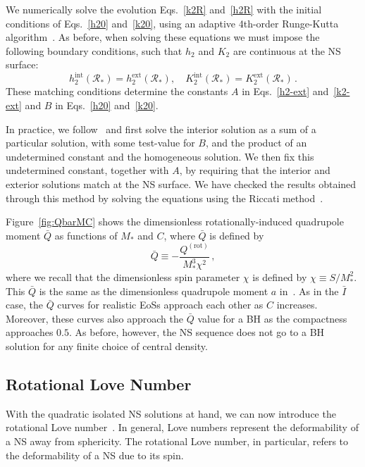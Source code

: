 \documentclass[aps,twocolumn,nofootinbib,showpacs,superscriptaddress,hyperref]{revtex4-1}
\newcommand\be{\begin{equation}}
\newcommand\ee{\end{equation}}
\newcommand{\NS}{*}
\newcommand{\ext}{\mathrm{ext}}
\newcommand{\inter}{\mathrm{int}}
\newcommand{\RNS}{\mathcal{R}_*}
\newcommand{\rot}{\mathrm{(rot)}}
\newcommand{\Qbar}{\bar{Q}}
\begin{document}
We numerically solve the evolution Eqs.~\eqref{k2R} and~\eqref{h2R} with the initial conditions of Eqs.~\eqref{h20} and~\eqref{k20}, using an adaptive 4th-order Runge-Kutta algorithm~\cite{gsl}. As before, when solving these equations we must impose the following boundary conditions, such that $h_2$ and $K_2$ are continuous at the NS surface:
%
\be
h_2^\inter (\RNS) = h_2^\ext (\RNS), \quad K_2^\inter (\RNS) = K_2^\ext (\RNS)\,.
\ee
%
These matching conditions determine the constants $A$ in Eqs.~\eqref{h2-ext} and~\eqref{k2-ext} and $B$ in Eqs.~\eqref{h20} and~\eqref{k20}. 

In practice, we follow~\cite{hartle1967,kent-CSNS} and first solve the interior solution as a sum of a particular solution, with some test-value for $B$, and the product of an undetermined constant and the homogeneous solution. We then fix this undetermined constant, together with $A$, by requiring that the interior and exterior solutions match at the NS surface. We have checked the results obtained through this method by solving the equations using the Riccati method~\cite{dieci1,dieci2,takata}.

Figure~\ref{fig:QbarMC} shows the dimensionless rotationally-induced quadrupole moment $\bar{Q}$ as functions of $M_\NS$ and $C$, where $\bar{Q}$ is defined by
%
\be
\label{bar-Q}
\bar{Q} \equiv -\frac{Q^\rot}{M_\NS^3 \chi^2}\,,
\ee
%
where we recall that the dimensionless spin parameter $\chi$ is defined by $\chi \equiv S/M_\NS^2$. This $\bar{Q}$ is the same as the dimensionless quadrupole moment $a$ in~\cite{poisson-quadrupole}. As in the $\bar{I}$ case, the $\bar{Q}$ curves for realistic EoSs approach each other as $C$ increases. Moreover, these curves also approach the $\Qbar$ value for a BH as the compactness approaches $0.5$. As before, however, the NS sequence does not go to a BH solution for any finite choice of central density. 


\subsection{Rotational Love Number}

With the quadratic isolated NS solutions at hand, we can now introduce the rotational Love number~\cite{mora-will}. In general, Love numbers represent the deformability of a NS away from sphericity. The rotational Love number, in particular, refers to the deformability of a NS due to its spin. 
\end{document}
